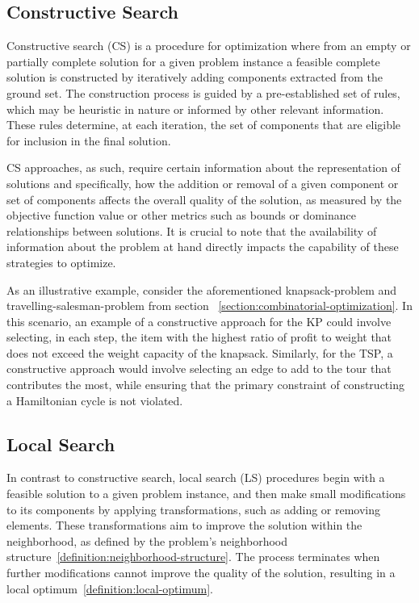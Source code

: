 \subsection{Constructive Search}
\label{section:contructive-search}

Constructive search (CS) is a procedure for optimization where from an empty or
partially complete solution for a given problem instance a feasible complete
solution is constructed by iteratively adding components extracted from the
ground set. The construction process is guided by a pre-established set of
rules, which may be heuristic in nature or informed by other relevant
information. These rules determine, at each iteration, the set of components
that are eligible for inclusion in the final solution.

CS approaches, as such, require certain information about the representation of
solutions and specifically, how the addition or removal of a given component or
set of components affects the overall quality of the solution, as measured by
the objective function value or other metrics such as bounds or dominance
relationships between solutions. It is crucial to note that the availability of
information about the problem at hand directly impacts the capability of these
strategies to optimize.

As an illustrative example, consider the aforementioned \acrshort{knapsack-problem} and
\acrshort{travelling-salesman-problem} from section
~\ref{section:combinatorial-optimization}. In this scenario, an example of a
constructive approach for the KP could involve selecting, in each step, the item
with the highest ratio of profit to weight that does not exceed the weight
capacity of the knapsack. Similarly, for the TSP, a constructive approach would
involve selecting an edge to add to the tour that contributes the most, while
ensuring that the primary constraint of constructing a Hamiltonian cycle is not
violated.

\subsection{Local Search}
\label{section:local-search}

In contrast to constructive search, local search (LS) procedures begin with a
feasible solution to a given problem instance, and then make small modifications
to its components by applying transformations, such as adding or removing
elements. These transformations aim to improve the solution within the
neighborhood, as defined by the problem's neighborhood
structure~\ref{definition:neighborhood-structure}. The process terminates when
further modifications cannot improve the quality of the solution, resulting in a
local optimum~\ref{definition:local-optimum}.


